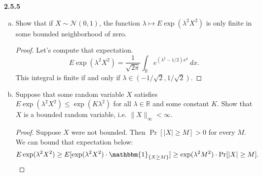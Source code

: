 \documentclass[11pt,letterpaper]{report}
\newcommand{\reals}{\mathbb{R}}
\newcommand{\mcal}[1]{\mathcal{#1}}
\newcommand{\ind}{\mathbbm{1}}
\begin{document}
\noindent\textbf{2.5.5}
\begin{enumerate}[(a)]
	\item Show that if $X\sim \mcal{N}(0, 1)$, the function $\lambda\mapsto E\exp(\lambda^2X^2)$ is only finite in some bounded neighborhood of zero.
	\begin{proof}
		Let's compute that expectation.
		\[
		E\exp(\lambda^2X^2) =\frac{1}{\sqrt{2\pi}}\int_\reals e^{(\lambda^2-1/2)x^2}\ dx.
		\]
		This integral is finite if and only if $\lambda\in(-1/\sqrt{2}, 1/\sqrt{2})$.
	\end{proof}

	\item Suppose that some random variable $X$ satisfies $E\exp(\lambda^2X^2)\leq \exp(K\lambda^2)$ for all $\lambda\in \reals$ and some constant $K$. Show that $X$ is a bounded random variable, i.e. $\|X\|_\infty<\infty$.
	\begin{proof}
		Suppose $X$ were not bounded. Then $\Pr[|X|\geq M]>0$ for every $M$. We can bound that expectation below:
		\[
		E\exp(\lambda^2X^2) \geq E[\exp(\lambda^2X^2)\cdot \ind_{\{X\geq M\}}] \geq \exp(\lambda^2M^2)\cdot \Pr[|X|\geq M].
		\]

	\end{proof}
\end{enumerate}
\end{document}
